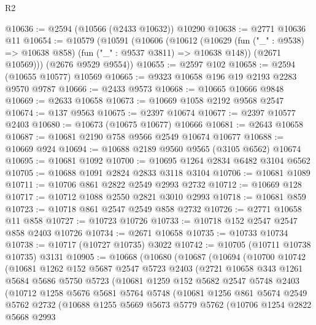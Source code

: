\begin{lexlean}{R2}
\begin{coremodule}
@10636 := @2594 (@10566 (@2433 @10632)) @10290
@10638 := @2771 @10636 @11
@10654 := @10579
    (@10591
      (@10606
        (@10612
          (@10629 (fun ("_" : @9538) => @10638 @858) (fun ("_" : @9537 @3811) => @10638 @148))
          (@2671 @10569)))
      (@2676 @9529 @9554))
@10655 := @2597 @102
@10658 := @2594 (@10655 @10577) @10569
@10665 := @9323 @10658 @196 @19 @2193 @2283 @9570 @9787
@10666 := @2433 @9573
@10668 := @10665 @10666 @9848
@10669 := @2633 @10658
@10673 := @10669 @1058 @2192 @9568 @2547
@10674 := @137 @9563
@10675 := @2397 @10674
@10677 := @2397 @10577 @2403
@10680 := @10673 (@10675 @10677) @10666
@10681 := @2643 @10658
@10687 := @10681 @2190 @758 @9566 @2549 @10674 @10677
@10688 := @10669 @924
@10694 := @10688 @2189 @9560 @9565 (@3105 @6562) @10674
@10695 := @10681 @1092
@10700 := @10695 @1264 @2834 @6482 @3104 @6562
@10705 := @10688 @1091 @2824 @2833 @3118 @3104
@10706 := @10681 @1089
@10711 := @10706 @861 @2822 @2549 @2993 @2732
@10712 := @10669 @128
@10717 := @10712 @1088 @2550 @2821 @3010 @2993
@10718 := @10681 @859
@10723 := @10718 @861 @2547 @2549 @858 @2732
@10726 := @2771 @10658 @11 @858
@10727 := @10723 @10726
@10733 := @10718 @152 @2547 @2547 @858 @2403 @10726
@10734 := @2671 @10658
@10735 := @10733 @10734
@10738 := @10717 (@10727 @10735) @3022
@10742 := @10705 (@10711 @10738 @10735) @3131
@10905 := @10668
    (@10680
      (@10687
        (@10694
          (@10700
            @10742
            (@10681
              @1262
              @152
              @5687
              @2547
              @5723
              @2403
              (@2721
                @10658
                @343
                @1261
                @5684
                @5686
                @5750
                @5723
                (@10681
                  @1259
                  @152
                  @5682
                  @2547
                  @5748
                  @2403
                  (@10712
                    @1258
                    @5676
                    @5681
                    @5764
                    @5748
                    (@10681
                      @1256
                      @861
                      @5674
                      @2549
                      @5762
                      @2732
                      (@10688
                        @1255
                        @5669
                        @5673
                        @5779
                        @5762
                        (@10706
                          @1254
                          @2822
                          @5668
                          @2993

\end{coremodule}
\end{lexlean}
